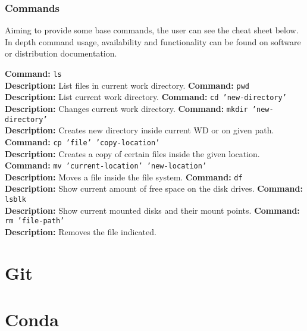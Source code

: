 \documentclass[a4paper,11pt]{article}
\begin{document}
\subsubsection{Commands}
Aiming to provide some base commands, the user can see the cheat sheet below. In
depth command usage, availability and functionality can be found on software or
distribution documentation.
\begin{cheatsheetbox}
\textbf{Command:} \texttt{ls} \\
\textbf{Description:} List files in current work directory.
\noindent\makebox[\linewidth]{\dotfill}
\textbf{Command:} \texttt{pwd} \\
\textbf{Description:} List current work directory.
\noindent\makebox[\linewidth]{\dotfill}
\textbf{Command:} \texttt{cd 'new-directory'} \\
\textbf{Description:} Changes current work directory.
\noindent\makebox[\linewidth]{\dotfill}
\textbf{Command:} \texttt{mkdir 'new-directory'} \\
\textbf{Description:} Creates new directory inside current WD or on given path.
\noindent\makebox[\linewidth]{\dotfill}
\textbf{Command:} \texttt{cp 'file' 'copy-location'} \\
\textbf{Description:} Creates a copy of certain files inside the given 
location.
\noindent\makebox[\linewidth]{\dotfill}
\textbf{Command:} \texttt{mv 'current-location' 'new-location'} \\
\textbf{Description:} Moves a file inside the file system.
\noindent\makebox[\linewidth]{\dotfill}
\textbf{Command:} \texttt{df} \\
\textbf{Description:} Show current amount of free space on the disk drives.
\noindent\makebox[\linewidth]{\dotfill}
\textbf{Command:} \texttt{lsblk} \\
\textbf{Description:} Show current mounted disks and their mount points.
\noindent\makebox[\linewidth]{\dotfill}
\textbf{Command:} \texttt{rm 'file-path'} \\
\textbf{Description:} Removes the file indicated.
\end{cheatsheetbox}

\section{Git}

\section{Conda}
\end{document}
